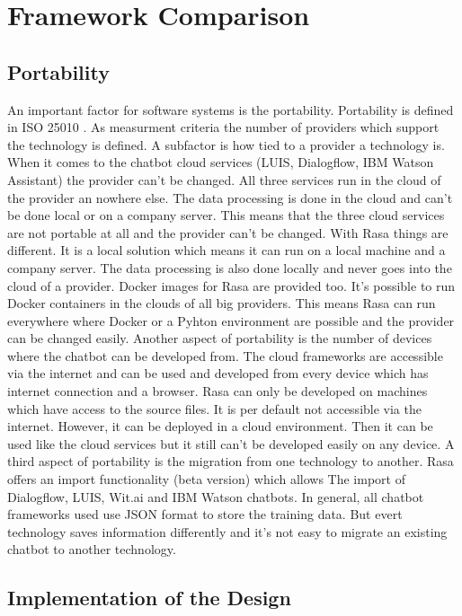 
\section{Framework Comparison}

\subsection*{Portability}
An important factor for software systems is the portability.
Portability is defined in ISO 25010 \cite{iso25010}.
As measurment criteria the number of providers which support the technology is defined.
A subfactor is how tied to a provider a technology is.
When it comes to the chatbot cloud services (LUIS, Dialogflow, IBM Watson Assistant)
the provider can't be changed.
All three services run in the cloud of the provider an nowhere else.
The data processing is done in the cloud and can't be done local or on a company server.
This means that the three cloud services are not portable at all and 
the provider can't be changed.
With Rasa things are different.
It is a local solution which means it can run on a local machine and a company server.
The data processing is also done locally and never goes into the cloud of a provider.
Docker images for Rasa are provided too.
It's possible to run Docker containers in the clouds of all big providers.
This means Rasa can run everywhere where Docker or a Pyhton environment are possible 
and the provider can be changed easily.
Another aspect of portability is the number of devices where the chatbot can be developed
from.
The cloud frameworks are accessible via the internet and can be used 
and developed from every device which has internet connection and a
browser.
Rasa can only be developed on machines which have access to the 
source files.
It is per default not accessible via the internet.
However, it can be deployed in a cloud environment.
Then it can be used like the cloud services but it 
still can't be developed easily on any device.
A third aspect of portability is the migration from one technology to another.
Rasa offers an import functionality (beta version) which allows The
import of Dialogflow, LUIS, Wit.ai and IBM Watson chatbots.
In general, all chatbot frameworks used use JSON format to store
the training data.
But evert technology saves information differently and it's not 
easy to migrate an existing chatbot to another technology.

\subsection*{Implementation of the Design}

